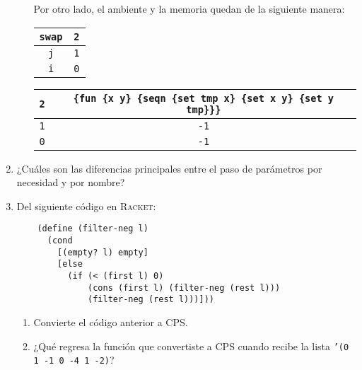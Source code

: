 \documentclass[letterpaper,11pt]{article}
\begin{document}
\begin{enumerate}
\begin{itemize}
        \newpage
        Por otro lado, el ambiente y la memoria quedan de la siguiente manera:
        \begin{table}[h]
            \parbox{.30\linewidth}{
            \centering
            \begin{tabular}{|c|c|}
            \hline
            \texttt{swap} & \texttt{2} \\
            \hline
            \texttt{j} & \texttt{1} \\
            \hline
            \texttt{i} & \texttt{0} \\
            \hline
            \end{tabular}
            }
            \hfill
            \parbox{.67\linewidth}{
            \centering
            \begin{tabular}{|c|c|}
            \hline
            \texttt{2} & \texttt{\{fun \{x y\} \{seqn \{set tmp x\}
                  \{set x y\}
                  \{set y tmp\}\}\}} \\
            \hline
            \texttt{1} & \texttt{-1} \\
            \hline
            \texttt{0} & \texttt{-1} \\
            \hline
            \end{tabular}
            }
        \end{table}
    \end{itemize}

    \item ¿Cuáles son las diferencias principales entre el paso de parámetros
    por necesidad y por nombre?

    \item Del siguiente código en \textsc{Racket}:
    \begin{verbatim}
    (define (filter-neg l)
      (cond
        [(empty? l) empty]
        [else 
          (if (< (first l) 0)
              (cons (first l) (filter-neg (rest l)))
              (filter-neg (rest l)))]))
    \end{verbatim}

    \begin{enumerate}
        \item Convierte el código anterior a CPS.
        \item ¿Qué regresa la función que convertiste a CPS cuando recibe la 
        lista \texttt{'(0 1 -1 0 -4 1 -2)}?
    \end{enumerate}


\end{enumerate}
\end{document}
